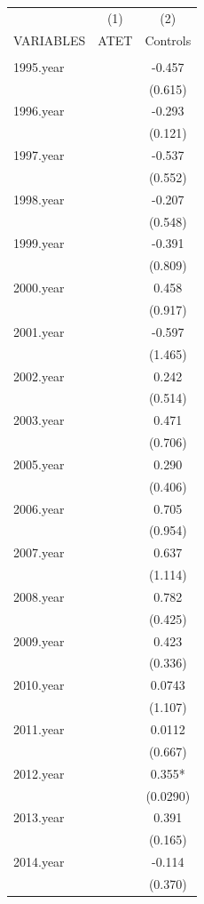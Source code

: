 \begin{table}[ht]
\centering
\tiny{
\begin{tabular}{lcc} \hline
 & (1) & (2) \\
VARIABLES & ATET & Controls \\ \hline
 &  &  \\
1995.year &  & -0.457 \\
 &  & (0.615) \\
1996.year &  & -0.293 \\
 &  & (0.121) \\
1997.year &  & -0.537 \\
 &  & (0.552) \\
1998.year &  & -0.207 \\
 &  & (0.548) \\
1999.year &  & -0.391 \\
 &  & (0.809) \\
2000.year &  & 0.458 \\
 &  & (0.917) \\
2001.year &  & -0.597 \\
 &  & (1.465) \\
2002.year &  & 0.242 \\
 &  & (0.514) \\
2003.year &  & 0.471 \\
 &  & (0.706) \\
2005.year &  & 0.290 \\
 &  & (0.406) \\
2006.year &  & 0.705 \\
 &  & (0.954) \\
2007.year &  & 0.637 \\
 &  & (1.114) \\
2008.year &  & 0.782 \\
 &  & (0.425) \\
2009.year &  & 0.423 \\
 &  & (0.336) \\
2010.year &  & 0.0743 \\
 &  & (1.107) \\
2011.year &  & 0.0112 \\
 &  & (0.667) \\
2012.year &  & 0.355* \\
 &  & (0.0290) \\
2013.year &  & 0.391 \\
 &  & (0.165) \\
2014.year &  & -0.114 \\
 &  & (0.370) \\

\end{tabular}}
\end{table}
